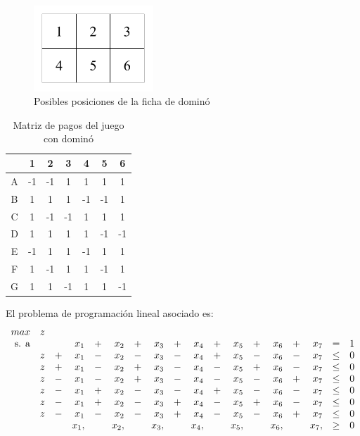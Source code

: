 \begin{figure}[ht]
\caption{Posibles posiciones de la ficha de dominó}
\label{fig:posiciones}
\centering
\includegraphics[width=0.4\textwidth]{figuras/posiciones.png}
\end{figure}

\begin{table}[ht]
\begin{center}
\caption[Matriz de pagos del juego con dominó]{Matriz de pagos del juego con dominó}
\label{table:pagos-domino}
\begin{tabular}{ c | c | c | c | c | c | c |}
  &  1 &  2 &  3 &  4 &  5 &  6 \\ \hline
A & -1 & -1 &  1 &  1 &  1 &  1 \\ \hline
B &  1 &  1 &  1 & -1 & -1 &  1 \\ \hline
C &  1 & -1 & -1 &  1 &  1 &  1 \\ \hline
D &  1 &  1 &  1 &  1 & -1 & -1 \\ \hline
E & -1 &  1 &  1 & -1 &  1 &  1 \\ \hline
F &  1 & -1 &  1 &  1 & -1 &  1 \\ \hline
G &  1 &  1 & -1 &  1 &  1 & -1 \\ \hline
\end{tabular}
\end{center}
\end{table}

El problema de programación lineal asociado es:
\begin{equation}
\begin{array}{r r r r r r r r r r r r r r r r r r}
max        &z& &   & &   & &   & &   & &   & &   & &   &      & \\
\text{s. a}
	& & &x_1&+&x_2&+&x_3&+&x_4&+&x_5&+&x_6&+&x_7& =    &1 \\
    &z&+&x_1&-&x_2&-&x_3&-&x_4&+&x_5&-&x_6&-&x_7& \leq &0 \\
    &z&+&x_1&-&x_2&+&x_3&-&x_4&-&x_5&+&x_6&-&x_7& \leq &0 \\
    &z&-&x_1&-&x_2&+&x_3&-&x_4&-&x_5&-&x_6&+&x_7& \leq &0 \\
    &z&-&x_1&+&x_2&-&x_3&-&x_4&+&x_5&-&x_6&-&x_7& \leq &0 \\
    &z&-&x_1&+&x_2&-&x_3&+&x_4&-&x_5&+&x_6&-&x_7& \leq &0 \\
    &z&-&x_1&-&x_2&-&x_3&+&x_4&-&x_5&-&x_6&+&x_7& \leq &0 \\
    & & &x_1,&&x_2,&&x_3,&&x_4,&&x_5,&&x_6,&&x_7,&\geq &0 \\
\end{array}
\end{equation}

